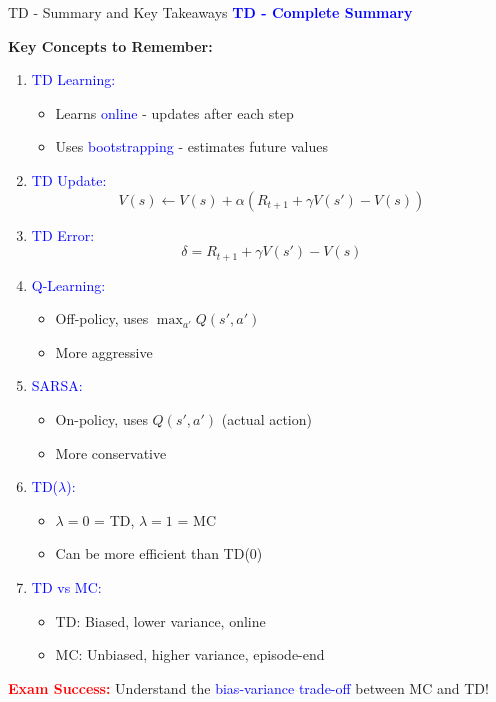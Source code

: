 \documentclass[8pt]{beamer}
\begin{document}
	\begin{frame}{TD - Summary and Key Takeaways}
		\fontsize{6.5}{7.5}\selectfont
		\textcolor{blue}{\textbf{TD - Complete Summary}}
		
		\textbf{Key Concepts to Remember:}
		
		\begin{enumerate}
			\item \textcolor{blue}{TD Learning:}
			\begin{itemize}
				\item Learns \textcolor{blue}{online} - updates after each step
				\item Uses \textcolor{blue}{bootstrapping} - estimates future values
			\end{itemize}
			
			\item \textcolor{blue}{TD Update:}
			\[
			V(s) \leftarrow V(s) + \alpha(R_{t+1} + \gamma V(s') - V(s))
			\]
			
			\item \textcolor{blue}{TD Error:}
			\[
			\delta = R_{t+1} + \gamma V(s') - V(s)
			\]
			
			\item \textcolor{blue}{Q-Learning:}
			\begin{itemize}
				\item Off-policy, uses $\max_{a'} Q(s',a')$
				\item More aggressive
			\end{itemize}
			
			\item \textcolor{blue}{SARSA:}
			\begin{itemize}
				\item On-policy, uses $Q(s',a')$ (actual action)
				\item More conservative
			\end{itemize}
			
			\item \textcolor{blue}{TD($\lambda$):}
			\begin{itemize}
				\item $\lambda=0$ = TD, $\lambda=1$ = MC
				\item Can be more efficient than TD(0)
			\end{itemize}
			
			\item \textcolor{blue}{TD vs MC:}
			\begin{itemize}
				\item TD: Biased, lower variance, online
				\item MC: Unbiased, higher variance, episode-end
			\end{itemize}
		\end{enumerate}
		
		\textcolor{red}{\textbf{Exam Success:}} Understand the \textcolor{blue}{bias-variance trade-off} between MC and TD!
	\end{frame}
	
\end{document}
